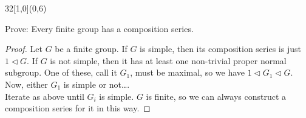 \documentclass[12pt]{article}
\newenvironment{exercise}[2]{\begin{textblock}{32}[1,0](0,#2)\noindent#1\end{textblock}}{\vspace{1in}}
\begin{document}

  \begin{exercise}{5.8}{6}
    {\noindent}Prove: Every finite group has a composition series.

    \begin{proof}
      Let $G$ be a finite group.
      If $G$ is simple, then its composition series is just $1\vartriangleleft G$.
      If $G$ is not simple, then it has at least one non-trivial proper normal subgroup.
      One of these, call it $G_1$, must be maximal, so we have $1\vartriangleleft G_1\vartriangleleft G$.\\
      Now, either $G_1$ is simple or not\dots.\\
      Iterate as above until $G_i$ is simple. $G$ is finite, so we can always construct a composition series for it in this way.
    \end{proof}
  \end{exercise}

\end{document}
